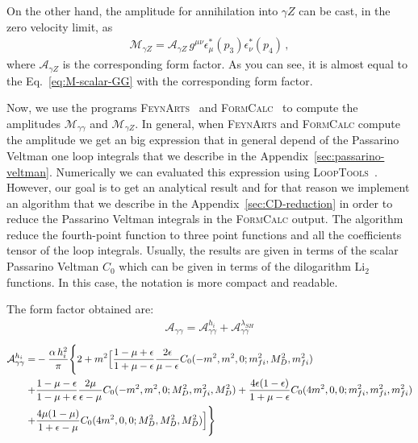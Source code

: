On the other hand, the amplitude for annihilation into $\gamma Z$ can be cast, in the zero velocity limit, as
\begin{align}
\label{eq:M-scalar-GZ}
\mathcal{M}_{\gamma Z}=\mathcal{A}_{\gamma Z}\,g^{\mu\nu}\epsilon_{\mu}^*(p_3)\epsilon_{\nu}^*(p_4)\,,
\end{align} 
%
where $\mathcal{A}_{\gamma Z}$ is the corresponding form factor. 
As you can see, it is almost equal to the Eq.~\eqref{eq:M-scalar-GG} with the corresponding form factor. 


Now, we use the programs \textsc{FeynArts}~\cite{Hahn:2000kx} and \textsc{FormCalc}~\cite{Hahn:1998yk} to compute the amplitudes $\mathcal{M}_{\gamma\gamma}$ and $\mathcal{M}_{\gamma Z}$. In general, when \textsc{FeynArts} and \textsc{FormCalc} compute the amplitude we get an big expression that in general depend of the Passarino Veltman one loop integrals that we describe in the Appendix~\ref{sec:passarino-veltman}. Numerically we can evaluated this expression using \textsc{LoopTools}~\cite{Hahn:1998yk}. However, our goal is to get an analytical result and for that reason we implement an algorithm that we describe in the Appendix~\ref{sec:CD-reduction} in order to reduce the Passarino Veltman integrals in the \textsc{FormCalc} output. The algorithm reduce the fourth-point function to three point functions and all the coefficients tensor of the loop integrals. Usually, the results are given in terms of the scalar Passarino Veltman $C_0$ which can be given in terms of the dilogarithm Li$_{2}$ functions. In this case, the notation is more compact and readable.

The form factor obtained are:
\begin{align}
\label{eq:form-factor-SSGG}
\mathcal{A}_{\gamma\gamma}=\mathcal{A}^{h_i}_{\gamma\gamma} + \mathcal{A}^{\lambda_{SH}}_{\gamma\gamma}
\end{align}
%
\begin{align}
\mathcal{A}^{h_i}_{\gamma\gamma}
=&-\dfrac{\alpha\, h_{i}^2}{\pi} \Bigg{\{ } 2+m^2 \Big{[}
 \dfrac{1-\mu+\epsilon}{1+\mu-\epsilon}\dfrac{2\epsilon}{\mu-\epsilon}C_0(-m^2,m^2,0;m_{fi}^2,M_D^2,m_{fi}^2)\nonumber \\
+&\dfrac{1-\mu-\epsilon}{1-\mu+\epsilon}\dfrac{2\mu}{\epsilon-\mu}C_0(-m^2,m^2,0;M_D^2,m_{fi}^2,M_D^2)
+\dfrac{4\epsilon(1-\epsilon)}{1+\mu-\epsilon}C_0(4m^2,0,0;m_{fi}^2,m_{fi}^2,m_{fi}^2)\nonumber \\
+&\dfrac{4\mu(1-\mu)}{1+\epsilon-\mu}C_0(4m^2,0,0;M_D^2,M_D^2,M_D^2) \Big{] } \Bigg{\} } 
\end{align}
%

